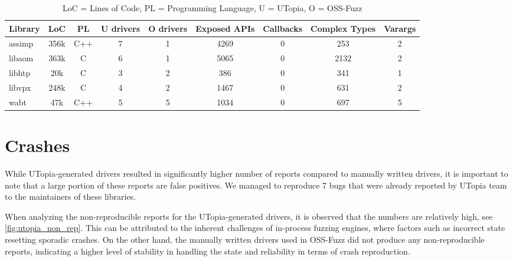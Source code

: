 \documentclass[a4paper,11pt,oneside]{report}
\begin{document}
\begin{table}[h]
\centering
\caption{LoC = Lines of Code, PL = Programming Language, U = UTopia, O = OSS-Fuzz}
\label{tab:library_comparison}
\begin{tabular}{|l|c|c|c|c|c|c|c|c|}
\hline
\textbf{Library} & \textbf{LoC} & \textbf{PL} & \textbf{U drivers} & \textbf{O drivers} & \textbf{Exposed APIs} & \textbf{Callbacks} & \textbf{Complex Types} & \textbf{Varargs}\\
\hline
assimp           & 356k        & C++ & 7 & 1 & 4269 & 0 & 253 & 2\\
libaom           & 363k        & C & 6 & 1 & 5065 & 0 & 2132 & 2\\
libhtp           & 20k         & C & 3 & 2 & 386 & 0 & 341 & 1\\
libvpx           & 248k        & C & 4 & 2 & 1467 & 0 & 631 & 2\\
wabt             & 47k         & C++ & 5 & 5 & 1034 & 0 & 697 & 5\\
\hline
\end{tabular}
\end{table}

\section{Crashes}

While UTopia-generated drivers resulted in significantly higher
number of reports compared to manually written drivers, it is
important to note that a large portion of these reports are false positives. 
We managed to reproduce 7 bugs that were already reported by UTopia team
to the maintainers of these libraries. 

When analyzing the non-reproducible reports for the UTopia-generated drivers, 
it is observed that the numbers are relatively high, see \autoref{fig:utopia_non_rep}. This can be attributed 
to the inherent challenges of in-process fuzzing engines, where factors such as 
incorrect state resetting sporadic crashes. On the other hand, the manually
written drivers used in OSS-Fuzz did not produce any non-reproducible reports,
indicating a higher level of stability in handling the state and reliability in terms of crash reproduction.
\end{document}
